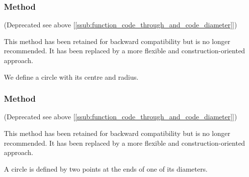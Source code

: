 \subsubsection{Method } %
\label{ssub:method_circle_radius}

(Deprecated see above [\ref{ssub:function_code_through_and_code_diameter}])

This method has been retained for backward compatibility but is no longer recommended. It has been replaced by a more flexible and construction-oriented approach.

We define a circle with its centre and radius. 

\vspace{1em}
\begin{tkzexample}[latex=.5\textwidth]
\begin{center}
\end{center}
\end{tkzexample}

\subsubsection{Method } %
\label{ssub:method_circle_diameter}

(Deprecated see above [\ref{ssub:function_code_through_and_code_diameter}])

This method has been retained for backward compatibility but is no longer recommended. It has been replaced by a more flexible and construction-oriented approach.

A circle is defined by two points at the ends of one of its diameters. 

\vspace{1em}
\begin{tkzexample}[latex=.5\textwidth]
\begin{center}
\end{center}
\end{tkzexample}

